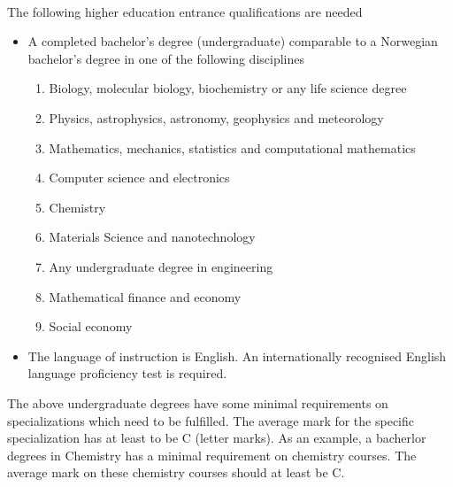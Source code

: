 \documentclass[%
oneside,                 %
final,                   %
10pt]{article}
\begin{document}
\paragraph{}
The following higher education entrance qualifications are needed

\begin{itemize}
\item A completed bachelor's degree (undergraduate) comparable to a Norwegian bachelor's degree in one of the following disciplines
\begin{enumerate}

 \item Biology, molecular biology, biochemistry  or any life science degree

 \item Physics, astrophysics, astronomy, geophysics and meteorology

 \item Mathematics, mechanics, statistics and computational mathematics

 \item Computer science and electronics

 \item Chemistry

 \item Materials Science and nanotechnology

 \item Any undergraduate degree in engineering

 \item Mathematical finance and economy

 \item Social economy

\end{enumerate}

\noindent
\item The language of instruction is English. An internationally recognised English language proficiency test is required.
\end{itemize}

\noindent
The above undergraduate degrees have some minimal requirements on specializations which need to be fulfilled.  The average mark 
for the specific specialization has at least to be C (letter marks).  
As an example, a bacherlor degrees in Chemistry has a minimal requirement on chemistry courses. The average mark on these chemistry courses should 
at least be C.
\end{document}
